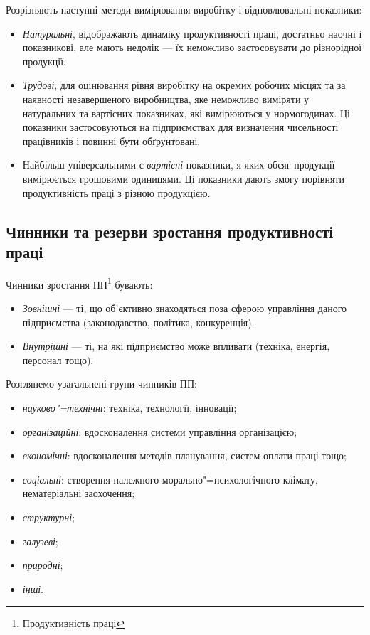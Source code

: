 \documentclass[a5paper,10pt,notitlepage,pdftex,headsepline]{scrartcl}
\begin{document}
    Розрізняють наступні методи вимірювання виробітку і відновлювальні
    показники:
    \begin{itemize}
      \item \emph{Натуральні}, відображають динаміку продуктивності праці,
        достатньо наочні і показникові, але мають недолік --- їх неможливо
        застосовувати до різнорідної продукції.
      \item \emph{Трудові}, для оцінювання рівня виробітку на окремих робочих
        місцях та за наявності незавершеного виробництва, яке неможливо
        виміряти у натуральних та вартісних показниках, які вимірюються у
        нормогодинах.
        Ці показники застосовуються на підприємствах для визначення
        чисельності працівників і повинні бути обґрунтовані.
      \item Найбільш універсальними є \emph{вартісні} показники, я яких обсяг
        продукції вимірюється грошовими одиницями.
        Ці показники дають змогу порівняти продуктивність праці з різною
        продукцією.
    \end{itemize}
  \subsection{Чинники та резерви зростання продуктивності праці}
  Чинники зростання ПП\footnote{Продуктивність праці} бувають:
  \begin{itemize}
    \item \emph{Зовнішні} --- ті, що об’єктивно знаходяться поза сферою
      управління даного підприємства (законодавство, політика, конкуренція).
    \item \emph{Внутрішні} --- ті, на які підприємство може впливати (техніка,
      енергія, персонал тощо).
  \end{itemize}

  Розглянемо узагальнені групи чинників ПП:
  \begin{itemize}
    \item \emph{науково"=технічні}: техніка, технології, інновації;
    \item \emph{організаційні}: вдосконалення системи управління організацією;
    \item \emph{економічні}: вдосконалення методів планування, систем оплати
      праці тощо;
    \item \emph{соціальні}: створення належного морально"=психологічного
      клімату, нематеріальні заохочення;
    \item \emph{структурні};
    \item \emph{галузеві};
    \item \emph{природні};
    \item \emph{інші}.
  \end{itemize}
\end{document}
